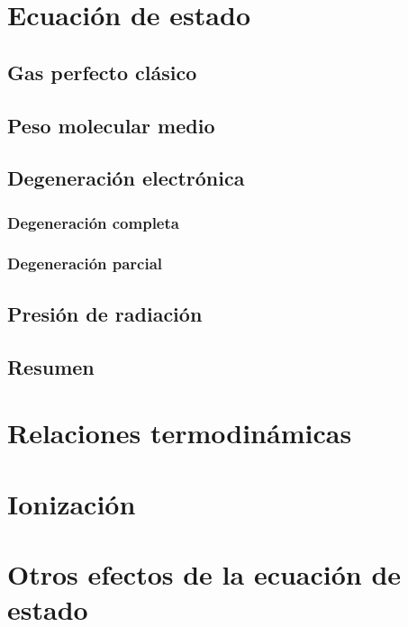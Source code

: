 \section{Ecuación de estado}
\subsection{Gas perfecto clásico}
\subsection{Peso molecular medio}
\subsection{Degeneración electrónica}
\subsubsection{Degeneración completa}
\subsubsection{Degeneración parcial}
\subsection{Presión de radiación}
\subsection{Resumen}

\section{Relaciones termodinámicas}
\section{Ionización}
\section{Otros efectos de la ecuación de estado}